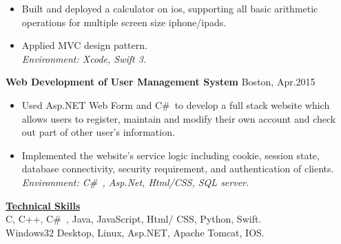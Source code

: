 \documentclass{resume} %
\begin{document}
\begin{spacing}{1}
\begin{center}
\vspace{0.1mm}
\begin{itemize}
\item{Built and deployed a calculator on ios, supporting all basic arithmetic operations for multiple screen size iphone/ipads. } \\
\item{Applied MVC design pattern. } \\
\hspace{-10.0mm}\textit{Environment: Xcode, Swift 3.}
\vspace{-1mm}
\end{itemize}
\vspace{1.9mm}
{\bf Web Development of User Management System} \hfill {\small  Boston, Apr.2015} \\
\vspace{0.1mm}
\begin{itemize}
\item{Used Asp.NET Web Form and C\#\ to develop a full stack website which allows users to register, maintain and modify their own account and check out part of other user’s information.} \\
\item{Implemented the website's service logic including cookie, session state, database connectivity, security requirement, and authentication of clients.} \\
\hspace{-10.0mm}\textit{Environment: C\#\ , Asp.Net, Html/CSS, SQL server.}
\vspace{-1mm}
\end{itemize}

\vspace{3mm}

\uline{{\bf{\LARGE Technical Skills}}\hfill{\hspace{10cm}{}}} \\
\vspace{1mm}
\hspace{-6.0cm}{\bf Languages:} \hspace{2cm} {C, C++,  C\#\ , Java, JavaScript, Html/ CSS, Python, Swift.} \\
\hspace{-5.85cm}{\bf Environment:} \hspace{1.55cm} {Windows32 Desktop, Linux, Asp.NET, Apache Tomcat, IOS. } \\


\end{center}
\end{spacing}
\end{document}
